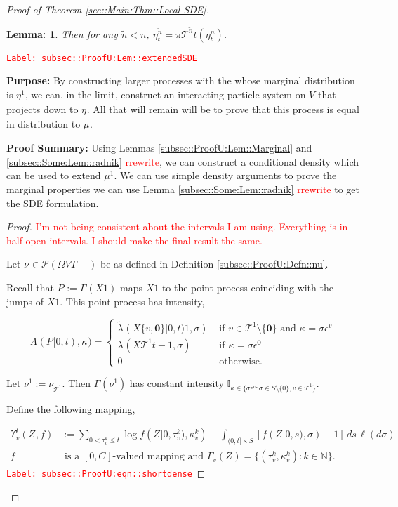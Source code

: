 \documentclass[12pt]{article}
\newcommand{\mb}{\mathbb}
\newcommand{\mc}{\mathcal}
\newcommand{\te}{\text}
\newcommand{\ep}{\epsilon}
\newcommand{\tr}{\textcolor{red}}
\newcommand{\labe}[1]{\tr{\texttt{Label: #1}}}
\newcommand{\purpose}{\textbf{Purpose: }}
\newcommand{\pfsum}{\textbf{Proof Summary: }}
\newcommand{\ind}{\hspace{24pt}}
\newcommand{\defeq}{:=}								%
\newcommand{\pmsr}{\mc{P}}							%
\renewcommand{\root}{\mathbf{0}}				%
\renewcommand{\v}{v}							%
\renewcommand{\S}{S}							%
\newcommand{\s}{\sigma}							%
\newcommand{\ev}[1]{\ep^{#1}}					%
\newcommand{\T}{T}								%
\renewcommand{\t}{t}							%
\newcommand{\proj}{\pi}							%
\renewcommand{\tt}{s}							%
\newcommand{\X}{X}								%
\newcommand{\pup}[1]{^{#1}}							%
\newcommand{\tree}{\mc{T}}							%
\newcommand{\V}{V}									%
\newcommand{\rt}[1]{\tau^{#1}}						%
\renewcommand{\it}{k}								%
\newcommand{\numb}{n}								%
\newcommand{\rxvttts}[2]{Z_{#1}{#2}}				%
\newcommand{\rp}[1]{P^{#1}}							%
\newcommand{\m}[3]{\mu_{#2#1}^{#3}}						%
\newcommand{\mm}[3]{\nu_{#2#1}^{#3}}						%
\newcommand{\mmm}[3]{\eta_{#2#1}^{#3}}						%
\newcommand{\rate}[1]{\lambda_{#1}}					%
\newcommand{\ratee}[1]{\Lambda_{#1}}				%
\newcommand{\crate}[2]{\alt{\lambda}_{#1}^{#2}}		%
\newcommand{\const}[1]{C_{#1}}						%
\newcommand{\Sm}{\ell}								%
\newcommand{\alt}{\widetilde}						%
\renewcommand{\mark}[1]{\kappa^{#1}}				%
\newcommand{\ds}[2]{\Upsilon_{#1}^{#2}}			%
\newcommand{\pmap}[1]{\Gamma_{#1}}				%
\newtheorem{lem}[thms]{Lemma: }
\begin{document}
\begin{proof}[Proof of Theorem \ref{sec::Main:Thm::Local SDE}]
\begin{lem}
Then for any \(\alt{\numb} < \numb\), \(\mmm{}{\t}{\alt{\numb}} = \proj{\tree\pup{\alt{\numb}}}{\t}(\mmm{}{\t}{\numb})\).
\label{subsec::ProofU:Lem::extendedSDE}
\end{lem}
\labe{subsec::ProofU:Lem::extendedSDE}

\purpose By constructing larger processes with the whose marginal distribution is \(\mmm{}{}{1}\), we can, in the limit, construct an interacting particle system on \(V\) that projects down to \(\mmm{}{}{}\). All that will remain will be to prove that this process is equal in distribution to \(\m{}{}{}\).

\pfsum Using Lemmas \ref{subsec::ProofU:Lem::Marginal} and \ref{subsec::Some:Lem::radnik} \tr{rrewrite}, we can construct a conditional density which can be used to extend \(\mu\pup{1}\). We can use simple density arguments to prove the marginal properties we can use Lemma \ref{subsec::Some:Lem::radnik} \tr{rrewrite} to get the SDE formulation.

\begin{proof}
\tr{I'm not being consistent about the intervals I am using. Everything is in half open intervals. I should make the final result the same.}

Let \(\mm{}{}{} \in \pmsr(\Omega{\V}{\T-})\) be as defined in Definition \ref{subsec::ProofU:Defn::nu}.

\ind Recall that \(\rp{} \defeq \pmap{}(\X{}{}{1})\) maps \(\X{}{}{1}\) to the point process coinciding with the jumps of \(\X{}{}{1}\). This point process has intensity,

\[\ratee{}(\rp{}[0,\t),\mark{}) = \begin{cases}
\crate{}{}(\X{\{\v,\root\}}{[0,\t)}{1},\s) &\te{ if } \v\in \tree\pup{1}\setminus\{\root\}\te{ and } \mark{} = \s\ev{\v}\\
\rate{}(\X{\tree\pup{1}}{\t-}{1},\s) &\te{ if } \mark{} = \s\ev{\root}\\
0 &\te{ otherwise}.
\end{cases}\]

Let \(\mm{}{}{1} \defeq \mm{\tree\pup{1}}{}{}\). Then \(\pmap{}(\mm{}{}{1})\) has constant intensity \(\mb{I}_{\kappa \in\{\s\ev{\v}:\s\in\S\setminus\{0\},\v\in\tree\pup{1}\}}\). 

\ind Define the following mapping,

\begin{align}
\ds{\v}{\t}(\rxvttts{}{},f) &\defeq \sum_{0 < \rt{\it}_\v \leq \t} \log{f(\rxvttts{}{[0,\rt{\it}_\v)},\mark{\it}_\v)} - \int_{(0,\t]\times \S} [f(\rxvttts{}{[0,\tt)},\s) - 1]\,ds\,\Sm(d\s) \label{subsec::ProofU:eqn::shortdense}\\
f&\te{ is a }[0,\const{}] \te{-valued mapping and } \pmap{\v}(\rxvttts{}{}) = \{(\rt{\it}_\v,\mark{\it}_\v):\it\in\mb{N}\}.\nonumber
\end{align} 
\labe{subsec::ProofU:eqn::shortdense}


\end{proof}
\end{proof}
\end{document}
